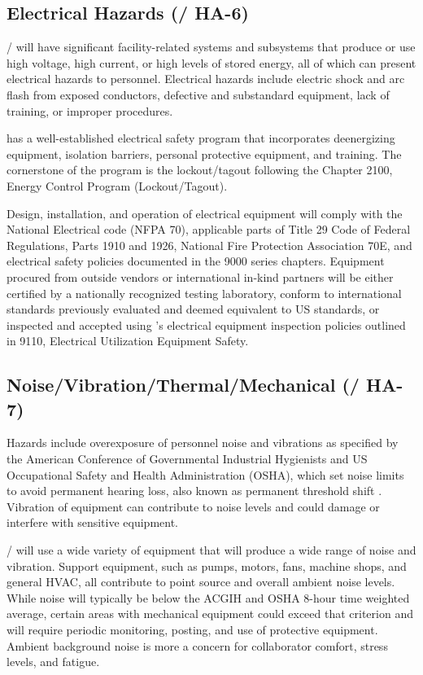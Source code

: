 \subsection{Electrical Hazards (/ HA-6)}

/ will have significant facility-related
systems and subsystems that produce or use high voltage, high current,
or high levels of stored energy, all of which can present electrical
hazards to personnel. Electrical hazards include electric shock and
arc flash from exposed conductors, defective and substandard
equipment, lack of training, or improper procedures.

\fnal has a well-established electrical safety program that
incorporates deenergizing equipment, isolation barriers, personal
protective equipment, and training. The cornerstone of the program is
the lockout/tagout following the  Chapter 2100, \fnal
Energy Control Program (Lockout/Tagout).

Design, installation, and operation of electrical equipment will
comply with the National Electrical code (NFPA 70), applicable parts
of Title 29 Code of Federal Regulations, Parts 1910 and 1926, National
Fire Protection Association 70E, and \fnal electrical safety policies
documented in the  9000 series chapters. Equipment
procured from outside vendors or international in-kind partners will
be either certified by a nationally recognized testing laboratory,
conform to international standards previously evaluated and deemed
equivalent to US standards, or inspected and accepted using \fnal's
electrical equipment inspection policies outlined in 
9110, Electrical Utilization Equipment Safety.


\subsection{Noise/Vibration/Thermal/Mechanical (/ HA-7)}

Hazards include overexposure of personnel noise and vibrations as
specified by the American Conference of Governmental Industrial
Hygienists and US Occupational Safety and Health Administration
(OSHA), which set noise limits to avoid permanent hearing loss, also
known as permanent threshold shift . Vibration of equipment can
contribute to noise levels and could damage or interfere with
sensitive equipment.

/ will use a wide variety of equipment that
will produce a wide range of noise and vibration. Support equipment,
such as pumps, motors, fans, machine shops, and general HVAC, all
contribute to point source and overall ambient noise levels. While
noise will typically be below the ACGIH and OSHA 8-hour time weighted
average, certain areas with mechanical equipment could exceed that
criterion and will require periodic monitoring, posting, and use of
protective equipment. Ambient background noise is more a concern for
collaborator comfort, stress levels, and fatigue.

